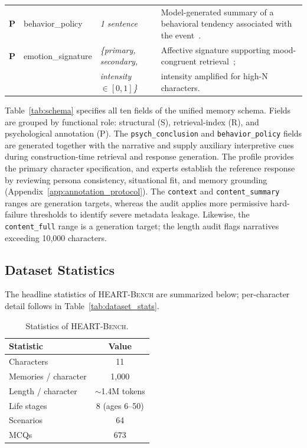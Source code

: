\documentclass[11pt]{article}
\newcommand{\ourbench}[0]{\textsc{HEART-Bench}\xspace}
\begin{document}
\begin{table}[!t]
\begin{tabular}{>{\bfseries}cp{2.8cm}p{3.2cm}p{6.0cm}}
\rowcolor{orange!8}
P & behavior\_policy   & \textit{1 sentence}          & Model-generated summary of a behavioral tendency associated with the event~\cite{young2006schema}. \\
\rowcolor{orange!8}
P & emotion\_signature & \textit{\{primary, secondary,}        & Affective signature supporting mood-congruent retrieval~\cite{bower1981}; \\
\rowcolor{orange!8}
  &                    & \textit{\quad intensity $\in [0,1]$\}} & intensity amplified for high-N characters. \\
\bottomrule
\end{tabular}
\end{table}

Table~\ref{tab:schema} specifies all ten fields of the unified memory schema. Fields are grouped by functional role: structural (S), retrieval-index (R), and psychological annotation (P). The \texttt{psych\_conclusion} and \texttt{behavior\_policy} fields are generated together with the narrative and supply auxiliary interpretive cues during construction-time retrieval and response generation. The profile provides the primary character specification, and experts establish the reference response by reviewing persona consistency, situational fit, and memory grounding (Appendix~\ref{app:annotation_protocol}).
The \texttt{context} and \texttt{content\_summary} ranges are generation targets, whereas the audit applies more permissive hard-failure thresholds to identify severe metadata leakage.
Likewise, the \texttt{content\_full} range is a generation target; the length audit flags narratives exceeding 10{,}000 characters.


\subsection{Dataset Statistics}
\label{app:stats}

The headline statistics of \ourbench are summarized below; per-character detail follows in Table~\ref{tab:dataset_stats}.

\begin{table}[ht]
\centering
\caption{Statistics of \ourbench.}
\label{tab:dataset_overview}
\small
\begin{tabular}{lc}
\toprule
\textbf{Statistic} & \textbf{Value} \\
\midrule
Characters           & 11 \\
Memories / character & 1{,}000 \\
Length / character   & $\sim$1.4M tokens \\
Life stages          & 8 (ages 6--50) \\
Scenarios            & 64 \\
MCQs                 & 673 \\
\bottomrule
\end{tabular}
\end{table}
\end{document}
